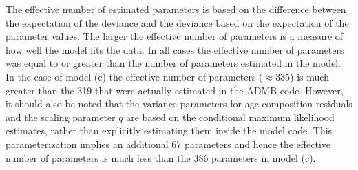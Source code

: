 \begin{table}[!tbh]
\begin{center}
\begin{tabular}{l|cccc}
		

		\hline

		\hline
		\end{tabular}
	\end{center}
\end{table}
The effective number of estimated parameters is based on the difference between the expectation of the deviance and the deviance based on the expectation of the parameter values.  The larger the effective number of parameters is a measure of how well the model fits the data.  In all cases the effective number of parameters was equal to or greater than the number of parameters estimated in the model.  In the case of model (c) the effective number of parameters ($\approx$335) is much greater than the 319 that were actually estimated in the ADMB code.  However, it should also be noted that the variance parameters for age-composition residuals and the scaling parameter $q$ \citep[see][]{walters1994calculation} are based on the conditional maximum likelihood estimates, rather than explicitly estimating them inside the model code.  This parameterization implies an additional 67 parameters and hence the effective number of parameters is much less than the 386 parameters in model (c).



